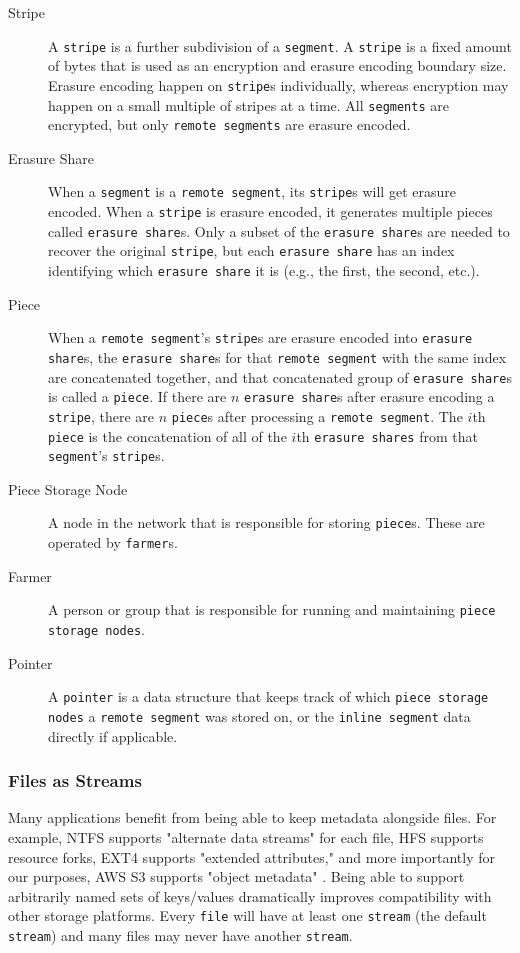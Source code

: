 \documentclass[a4paper,10pt]{article} \usepackage[utf8]{inputenc}
\newcommand{\x}[1]{{\tt #1}} \newcommand{\code}[1]{{\tt #1}}
\begin{document}
\begin{description}
\item[Stripe] A \x{stripe} is a further subdivision of a \x{segment}. A
\x{stripe} is a fixed amount of bytes that is used as an encryption and erasure
encoding boundary size. Erasure encoding happen on \x{stripe}s individually,
whereas encryption may happen on a small multiple of stripes at a time. All
\x{segments} are encrypted, but only \x{remote segments} are erasure encoded.

\item[Erasure Share] When a \x{segment} is a \x{remote segment}, its \x{stripe}s
will get erasure encoded. When a \x{stripe} is erasure encoded, it generates
multiple pieces called \x{erasure share}s. Only a subset of the \x{erasure
share}s are needed to recover the original \x{stripe}, but each \x{erasure
share} has an index identifying which \x{erasure share} it is (e.g., the first,
the second, etc.).

\item[Piece] When a \x{remote segment}'s \x{stripe}s are erasure encoded into
\x{erasure share}s, the \x{erasure share}s for that \x{remote segment} with the
same index are concatenated together, and that concatenated group of \x{erasure
share}s is called a \x{piece}. If there are $n$ \x{erasure share}s after erasure
encoding a \x{stripe}, there are $n$ \x{piece}s after processing a \x{remote
segment}. The $i$th \x{piece} is the concatenation of all of the $i$th
\x{erasure shares} from that \x{segment}'s \x{stripe}s.

\item[Piece Storage Node] A node in the network that is responsible for storing
\x{piece}s. These are operated by \x{farmer}s.

\item[Farmer] A person or group that is responsible for running and maintaining
\x{piece storage nodes}.

\item[Pointer] A \x{pointer} is a data structure that keeps track of which
\x{piece storage nodes} a \x{remote segment} was stored on, or the \x{inline
segment} data directly if applicable.

\end{description}

\subsubsection{Files as Streams}

Many applications benefit from being able to keep metadata alongside files. For
example, NTFS supports "alternate data streams" for each file, HFS supports
resource forks, EXT4 supports "extended attributes," and more importantly for
our purposes, AWS S3 supports "object metadata" \cite{s3-object-meta}. Being
able to support arbitrarily named sets of keys/values dramatically improves
compatibility with other storage platforms. Every \x{file} will have at least
one
\x{stream} (the default \x{stream}) and many files may never have another
\x{stream}.
\end{document}
